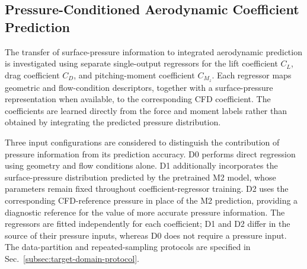 
\subsection{Pressure-Conditioned Aerodynamic Coefficient Prediction}
\label{subsec:force-coefficient-prediction}

The transfer of surface-pressure information to integrated aerodynamic prediction is investigated using separate single-output regressors for the lift coefficient $C_L$, drag coefficient $C_D$, and pitching-moment coefficient $C_{M_z}$. Each regressor maps geometric and flow-condition descriptors, together with a surface-pressure representation when available, to the corresponding CFD coefficient. The coefficients are learned directly from the force and moment labels rather than obtained by integrating the predicted pressure distribution.

Three input configurations are considered to distinguish the contribution of pressure information from its prediction accuracy. D0 performs direct regression using geometry and flow conditions alone. D1 additionally incorporates the surface-pressure distribution predicted by the pretrained M2 model, whose parameters remain fixed throughout coefficient-regressor training. D2 uses the corresponding CFD-reference pressure in place of the M2 prediction, providing a diagnostic reference for the value of more accurate pressure information. The regressors are fitted independently for each coefficient; D1 and D2 differ in the source of their pressure inputs, whereas D0 does not require a pressure input. The data-partition and repeated-sampling protocols are specified in Sec.~\ref{subsec:target-domain-protocol}.

